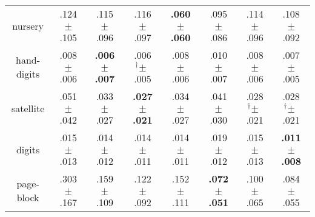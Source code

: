 \begin{tabular}{|c|ccccccc|}
nursery & .124$^{\phantom{\dag}}\pm^{\phantom{\dag}}$.105\cellcolor{red!40} & .115$^{\phantom{\dag}}\pm^{\phantom{\dag}}$.096\cellcolor{red!28} & .116$^{\phantom{\dag}}\pm^{\phantom{\dag}}$.097\cellcolor{red!29} & \textbf{.060$^{\phantom{\dag}}\pm^{\phantom{\dag}}$.060}\cellcolor{green!40} & .095$^{\phantom{\dag}}\pm^{\phantom{\dag}}$.086\cellcolor{red!3} & .114$^{\phantom{\dag}}\pm^{\phantom{\dag}}$.096\cellcolor{red!27} & .108$^{\phantom{\dag}}\pm^{\phantom{\dag}}$.092\cellcolor{red!20} \\
hand-digits & .008$^{\phantom{\dag}}\pm^{\phantom{\dag}}$.006\cellcolor{green!1} & \textbf{.006$^{\phantom{\dag}}\pm^{\phantom{\dag}}$.007}\cellcolor{green!40} & .006$^{\dag}\pm^{\phantom{\dag}}$.005\cellcolor{green!30} & .008$^{\phantom{\dag}}\pm^{\phantom{\dag}}$.006\cellcolor{green!2} & .010$^{\phantom{\dag}}\pm^{\phantom{\dag}}$.007\cellcolor{red!40} & .008$^{\phantom{\dag}}\pm^{\phantom{\dag}}$.006\cellcolor{green!3} & .007$^{\phantom{\dag}}\pm^{\phantom{\dag}}$.005\cellcolor{green!14} \\
satellite & .051$^{\phantom{\dag}}\pm^{\phantom{\dag}}$.042\cellcolor{red!40} & .033$^{\phantom{\dag}}\pm^{\phantom{\dag}}$.027\cellcolor{green!17} & \textbf{.027$^{\phantom{\dag}}\pm^{\phantom{\dag}}$.021}\cellcolor{green!40} & .034$^{\phantom{\dag}}\pm^{\phantom{\dag}}$.027\cellcolor{green!14} & .041$^{\phantom{\dag}}\pm^{\phantom{\dag}}$.030\cellcolor{red!8} & .028$^{\dag}\pm^{\phantom{\dag}}$.021\cellcolor{green!36} & .028$^{\dag}\pm^{\phantom{\dag}}$.021\cellcolor{green!36} \\
digits & .015$^{\phantom{\dag}}\pm^{\phantom{\dag}}$.013\cellcolor{red!1} & .014$^{\phantom{\dag}}\pm^{\phantom{\dag}}$.012\cellcolor{green!9} & .014$^{\phantom{\dag}}\pm^{\phantom{\dag}}$.011\cellcolor{green!6} & .014$^{\phantom{\dag}}\pm^{\phantom{\dag}}$.011\cellcolor{green!10} & .019$^{\phantom{\dag}}\pm^{\phantom{\dag}}$.012\cellcolor{red!40} & .015$^{\phantom{\dag}}\pm^{\phantom{\dag}}$.013\cellcolor{red!3} & \textbf{.011$^{\phantom{\dag}}\pm^{\phantom{\dag}}$.008}\cellcolor{green!40} \\
page-block & .303$^{\phantom{\dag}}\pm^{\phantom{\dag}}$.167\cellcolor{red!40} & .159$^{\phantom{\dag}}\pm^{\phantom{\dag}}$.109\cellcolor{green!9} & .122$^{\phantom{\dag}}\pm^{\phantom{\dag}}$.092\cellcolor{green!22} & .152$^{\phantom{\dag}}\pm^{\phantom{\dag}}$.111\cellcolor{green!12} & \textbf{.072$^{\phantom{\dag}}\pm^{\phantom{\dag}}$.051}\cellcolor{green!40} & .100$^{\phantom{\dag}}\pm^{\phantom{\dag}}$.065\cellcolor{green!30} & .084$^{\phantom{\dag}}\pm^{\phantom{\dag}}$.055\cellcolor{green!35} \\

\end{tabular}
